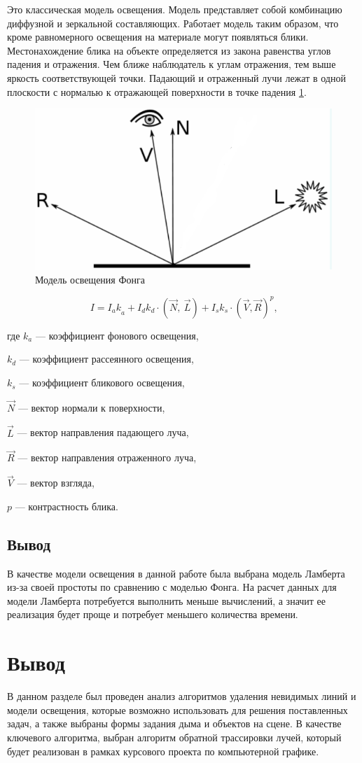 Это классическая модель освещения. Модель представляет собой комбинацию диффузной и зеркальной составляющих. Работает модель таким образом, что кроме равномерного освещения на материале могут появляться блики. Местонахождение блика на объекте определяется из закона равенства углов падения и отражения. Чем ближе наблюдатель к углам отражения, тем выше яркость соответствующей точки. Падающий и отраженный лучи лежат в одной плоскости с нормалью к отражающей поверхности в точке падения \ref{fig:phong}.
\begin{figure}[H]
	\centering
	\includegraphics[width=1\linewidth]{inc/img/phong}
	\caption[]{Модель освещения Фонга}
	\label{fig:phong}
\end{figure}
\begin{equation}
	I={I_ak}_a+I_dk_d\cdot\left(\vec{N},\ \vec{L}\right)+I_sk_s\cdot{(\vec{V},\vec{R})}^p\text{,}
\end{equation}

где $k_a$ --- коэффициент фонового освещения,

$k_d$ --- коэффициент рассеянного освещения,

$k_s$ --- коэффициент бликового освещения,

$\vec{N}$ --- вектор нормали к поверхности,

$\vec{L}$ --- вектор направления падающего луча,
 
$\vec{R}$ --- вектор направления отраженного луча,

$\vec{V}$ --- вектор взгляда,

$p$ --- контрастность блика.

\subsection*{Вывод}
В качестве модели освещения в данной работе была выбрана модель Ламберта из-за своей простоты по сравнению с моделью Фонга. На расчет данных для модели Ламберта потребуется выполнить меньше вычислений, а значит ее реализация будет проще и потребует меньшего количества времени. 
\section*{Вывод} 
В данном разделе был проведен анализ алгоритмов удаления невидимых линий и модели освещения, которые возможно использовать для решения поставленных задач, а также выбраны формы задания дыма и объектов на сцене. В качестве ключевого алгоритма, выбран алгоритм обратной трассировки лучей, который будет реализован в рамках курсового проекта по компьютерной графике.

